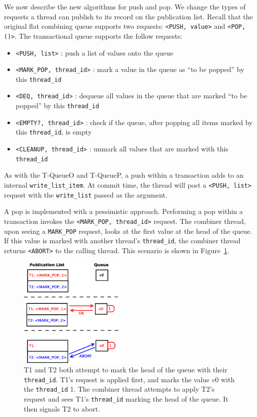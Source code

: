 We now describe the new algorithms for push and pop.  We change the types of requests a thread can publish to its record on the publication list. Recall that the original flat combining queue supports two requests: \texttt{<PUSH, value>} and \texttt{<POP, ()>}. The transactional queue supports the follow requests:
\begin{itemize}
    \item \texttt{<PUSH, list>} : push a list of values onto the queue
    \item \texttt{<MARK\_POP, thread\_id>} : mark a value in the queue as ``to be popped'' by this \texttt{thread\_id}
    \item \texttt{<DEQ, thread\_id>} : dequeue all values in the queue that are marked ``to be popped'' by this \texttt{thread\_id}
    \item \texttt{<EMPTY?, thread\_id>} : check if the queue, after popping all items marked by this \texttt{thread\_id}, is empty
    \item \texttt{<CLEANUP, thread\_id>} : unmark all values that are marked with this \texttt{thread\_id}
\end{itemize}

As with the T-QueueO and T-QueueP, a push within a transaction adds to an internal \texttt{write\_list\_item}. At commit time, the thread will post a \texttt{<PUSH, list>} request with the \texttt{write\_list} passed as the argument.

A pop is implemented with a pessimistic approach. Performing a pop within a transaction invokes the \texttt{<MARK\_POP, thread\_id>} request. The combiner thread, upon seeing a \texttt{MARK\_POP} request, looks at the first value at the head of the queue. If this value is marked with another thread's \texttt{thread\_id}, the combiner thread returns \texttt{<ABORT>} to the calling thread. This scenario is shown in Figure~\ref{fig:fcqueue_abort1}.

\begin{figure}[t]
\centering
\includegraphics[width=0.45\textwidth]{fcqueue_abort1}
    \caption[Abort when performing conflicting pop requests]{T1 and T2 both attempt to mark the head of the queue with their \texttt{thread\_id}. T1's request is applied first, and marks the value $v0$ with the \texttt{thread\_id} 1. The combiner thread attempts to apply T2's request and sees T1's \texttt{thread\_id} marking the head of the queue. It then signals T2 to abort.}
\label{fig:fcqueue_abort1}
\end{figure}

